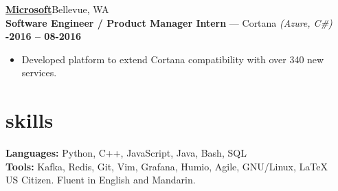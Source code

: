 \documentclass[margin,10pt]{res/res}
\begin{document}
\begin{resume}
    \href{https://careers.microsoft.com/professionals/us/en/c-engineering}{\textbf{\large {}  Microsoft}}\hfill Bellevue, WA\\
    \textbf{Software Engineer / Product Manager Intern} --- Cortana
    \textit{(Azure, C\#)}\hfill
    \textsc{\bfseries{}-2016 -- 08-2016}
    \vspace{0.5em}
    \begin{itemize}
        \item Developed platform to extend Cortana compatibility with over 340 new services.
    \end{itemize}

\vspace{5pt}

\section{\sc \lsstyle skills}
    \textbf{Languages:}
    Python, C++, JavaScript, Java, Bash, SQL\\
    \textbf{Tools:} Kafka, Redis, Git, Vim, Grafana, Humio, Agile, GNU/Linux, \LaTeX\\
    US Citizen. Fluent in English and Mandarin.
\end{resume}

\vspace{5pt}
\end{document}

